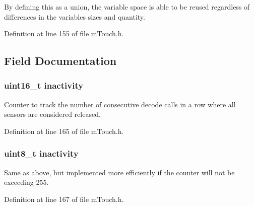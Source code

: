 By defining this as a union, the variable space is able to be reused regardless of differences in the variables\textquotesingle{} sizes and quantity. 

Definition at line 155 of file m\+Touch.\+h.



\subsection{Field Documentation}
\hypertarget{structm_touch___state_variables_ac0aad0e526866eb2e45ffabeaa89453d}{}
\subsubsection[{inactivity}]{\setlength{\rightskip}{0pt plus 5cm}uint16\+\_\+t inactivity}\label{structm_touch___state_variables_ac0aad0e526866eb2e45ffabeaa89453d}


Counter to track the number of consecutive decode calls in a row where all sensors are considered released. 



Definition at line 165 of file m\+Touch.\+h.

\hypertarget{structm_touch___state_variables_a5b3fdb1d6accca0c21fbf4ae06912074}{}
\subsubsection[{inactivity}]{\setlength{\rightskip}{0pt plus 5cm}uint8\+\_\+t inactivity}\label{structm_touch___state_variables_a5b3fdb1d6accca0c21fbf4ae06912074}


Same as above, but implemented more efficiently if the counter will not be exceeding 255. 



Definition at line 167 of file m\+Touch.\+h.

\hypertarget{structm_touch___state_variables_a99c520ba011c1d8bcb6a72ffd51196c9}{}

